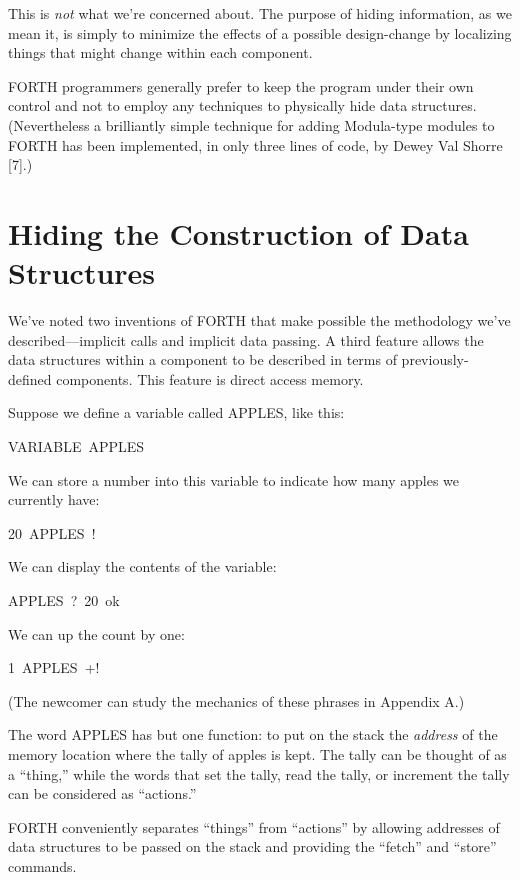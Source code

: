 This is \emph{not} what we're concerned about. The purpose of hiding
information, as we mean it, is simply to minimize the effects of a
possible design-change by localizing things that might change within
each component.

FORTH programmers generally prefer to keep the program under their
own control and not to employ any techniques to physically hide data
structures. (Nevertheless a brilliantly simple technique for adding
Modula-type modules to FORTH has been implemented, in only three lines
of code, by Dewey Val Shorre {[}7{]}.)


\section*{Hiding the Construction of Data Structures}

We've noted two inventions of FORTH that make possible the methodology
we've described---implicit calls and implicit data passing. A third
feature allows the data structures within a component to be described
in terms of previously-defined components. This feature is direct
access memory.

Suppose we define a variable called APPLES, like this:

\begin{lyxcode}
VARIABLE~APPLES
\end{lyxcode}
We can store a number into this variable to indicate how many apples
we currently have:

\begin{lyxcode}
20~APPLES~!
\end{lyxcode}
We can display the contents of the variable:

\begin{lyxcode}
APPLES~?~20~ok
\end{lyxcode}
We can up the count by one:

\begin{lyxcode}
1~APPLES~+!
\end{lyxcode}
(The newcomer can study the mechanics of these phrases in Appendix
A.)

The word APPLES has but one function: to put on the stack the \emph{address}
of the memory location where the tally of apples is kept. The tally
can be thought of as a {}``thing,'' while the words that set the
tally, read the tally, or increment the tally can be considered as
{}``actions.''

FORTH conveniently separates {}``things'' from {}``actions'' by
allowing addresses of data structures to be passed on the stack and
providing the {}``fetch'' and {}``store'' commands.

